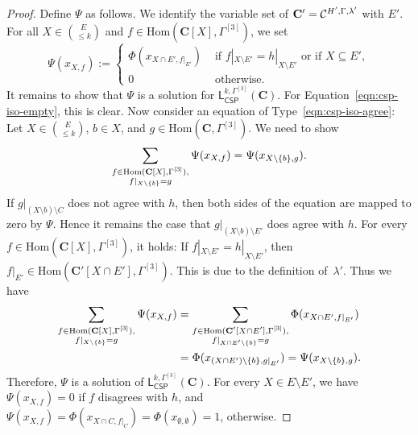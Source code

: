 \documentclass[a4paper,english, thm-restate]{lipics-v2021}
\DeclarePairedDelimiter\set{\lbrace}{\rbrace}
\newcommand{\StructC}{\mathbf{C}}
\newcommand{\restrict}[2]{#1|_{#2}}
\newcommand{\Hom}[2]{\mathrm{Hom}(#1,#2)}
\newcommand{\leqs}{\mathsf{L}}
\newcommand{\cspiso}[3]{\leqs^{#1,#2}_{\mathsf{CSP}}(#3)}
\newcommand{\CosetGrpTmplt}[2]{#1^{[#2]}}
\begin{document}
	\begin{proof}
		Define $\Psi$ as follows. We identify the variable set of $\StructC' = \grpCSP{H'}{\Gamma}{\lambda'}$
		with $E'$. For all $X \in \binom{E}{\leq k}$ and $f \in \Hom{\StructC[X]}{\CosetGrpTmplt{\Gamma}{3}}$, we set
		\[
		\Psi(x_{X,f}) := \begin{cases}
			\Phi(x_{X \cap E',f|_{E'}}) & \text{ if } f|_{X \setminus E'} = h|_{X \setminus E'} \text{ or if } X \subseteq E',\\
			0 & \text{ otherwise.}
		\end{cases}
		\]
		It remains to show that $\Psi$ is a solution for $\cspiso{k}{\CosetGrpTmplt{\Gamma}{3}}{\StructC}$.
		For Equation~\ref{eqn:csp-iso-empty}, this is clear. Now consider an equation of Type~\ref{eqn:csp-iso-agree}:
		Let $X \in \binom{E}{\leq k}$, $b \in X$, and $g \in \Hom{\StructC}{\CosetGrpTmplt{\Gamma}{3}}$.
		We need to show 
		\[\sum_{\substack{f \in \Hom{\StructC[X]}{\CosetGrpTmplt{\Gamma}{3}},\\ \restrict{f}{X\setminus\set{b}} = g}} \Psi(x_{X,f}) =  \Psi(x_{X\setminus \{b\},g}).\]
		If $g|_{(X \setminus b) \setminus C}$ does not agree with $h$, then both sides of the equation are mapped to zero by $\Psi$. Hence it remains the case that $g|_{(X \setminus b) \setminus E'}$ does agree with $h$.
		For every $f \in \Hom{\StructC[X]}{\CosetGrpTmplt{\Gamma}{3}}$, it holds: If $f|_{X \setminus E'} = h|_{X \setminus E'}$, then $f|_{E'} \in \Hom{\StructC'[X \cap E']}{\CosetGrpTmplt{\Gamma}{3}}$. This is due to the definition of~$\lambda'$. Thus we have
		\begin{align*}
			\sum_{\substack{f \in \Hom{\StructC[X]}{\CosetGrpTmplt{\Gamma}{3}},\\ \restrict{f}{X\setminus\set{b}} = g}} \Psi(x_{X,f}) &= \sum_{\substack{f \in \Hom{\StructC'[X \cap E']}{\CosetGrpTmplt{\Gamma}{3}},\\ \restrict{f}{X \cap E' \setminus\set{b}} = g}} \Phi(x_{X \cap E',f|_{E'}})\\
			&= \Phi(x_{(X \cap E')\setminus \{b\},g|_{E'}}) = \Psi(x_{X\setminus \{b\},g}  ).
		\end{align*}	
		Therefore, $\Psi$ is a solution of $\cspiso{k}{\CosetGrpTmplt{\Gamma}{3}}{\StructC}$. For every $X \in E \setminus E'$, we have $\Psi(x_{X,f}) = 0$ if $f$ disagrees with $h$, and $\Psi(x_{X,f}) = \Phi(x_{X \cap C,f|_{C}}) = \Phi(x_{\emptyset,\emptyset}) = 1$, otherwise.
	\end{proof}	
	
	
	
\end{document}
